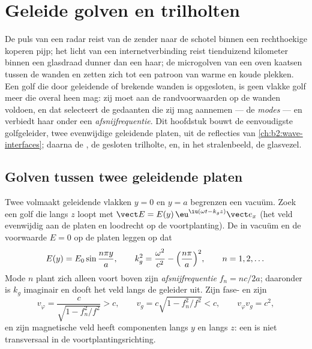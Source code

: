 \chapter{Geleide golven en trilholten}\label{ch:b2:guided-waves}

De puls van een radar reist van de zender naar de schotel binnen een
rechthoekige koperen pijp; het licht van een internetverbinding reist
tienduizend kilometer binnen een glasdraad dunner dan een haar; de
microgolven van een oven kaatsen tussen de wanden en zetten zich tot een
patroon van warme en koude plekken. Een golf die door geleidende of brekende
wanden is opgesloten, is geen vlakke golf meer die overal heen mag: zij moet
aan de randvoorwaarden op de wanden voldoen, en dat selecteert de gedaanten
die zij mag aannemen --- de \emph{modes} --- en verbiedt haar onder een
\emph{afsnijfrequentie}. Dit hoofdstuk bouwt de eenvoudigste golfgeleider,
twee evenwijdige geleidende platen, uit de reflecties van
\cref{ch:b2:wave-interfaces}; daarna de , de
gesloten trilholte, en, in het stralenbeeld, de glasvezel.

\section{Golven tussen twee geleidende platen}

\begin{proposition}\label{prop:b2:guided-waves:plates}
Twee volmaakt geleidende vlakken $y = 0$ en $y = a$ begrenzen een vacuüm.
Zoek een golf die langs $z$ loopt met
$\vect E = E(y)\,\eu^{\iu(\omega t - k_gz)}
\vect e_x$ (het veld evenwijdig
aan de platen en loodrecht op de voortplanting). De  in vacuüm en de voorwaarde $E = 0$ op de platen leggen op dat
\[
E(y) = E_0\sin\frac{n\pi y}a , \qquad
k_g^2 = \frac{\omega^2}{c^2} - \Bigl(\frac{n\pi}a\Bigr)^2 , \qquad n = 1, 2, \dots
\]
Mode $n$ plant zich alleen voort boven zijn \emph{afsnijfrequentie}
$f_n = nc/2a$; daaronder is $k_g$ imaginair en dooft het veld langs de
geleider uit. Zijn fase- en  zijn
\[
v_\varphi = \frac c{\sqrt{1 - f_n^2/f^2}} > c , \qquad
v_g = c\sqrt{1 - f_n^2/f^2} < c , \qquad v_\varphi v_g = c^2 ,
\]
en zijn magnetische veld heeft componenten langs $y$ en langs $z$: een
 is niet transversaal in de voortplantingsrichting.
\end{proposition}

